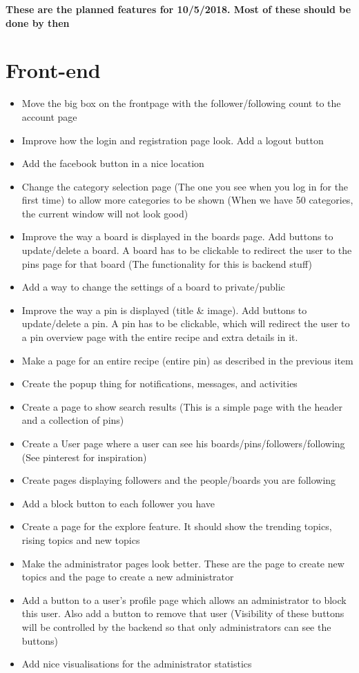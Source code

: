 \documentclass{article}
\begin{document}
\textbf{These are the planned features for 10/5/2018. Most of these should be done by then}

\section{Front-end}
\begin{itemize}
\item Move the big box on the frontpage with the follower/following count to the account page
\item Improve how the login and registration page look. Add a logout button
\item Add the facebook button in a nice location
\item Change the category selection page (The one you see when you log in for the first time) to allow more categories to be shown (When we have 50 categories, the current window will not look good)
\item Improve the way a board is displayed in the boards page. Add buttons to update/delete a board. A board has to be clickable to redirect the user to the pins page for that board (The functionality for this is backend stuff)
\item Add a way to change the settings of a board to private/public
\item Improve the way a pin is displayed (title \& image). Add buttons to update/delete a pin. A pin has to be clickable, which will redirect the user to a pin overview page with the entire recipe and extra details in it.
\item Make a page for an entire recipe (entire pin) as described in the previous item 
\item Create the popup thing for notifications, messages, and activities
\item Create a page to show search results (This is a simple page with the header and a collection of pins)
\item Create a User page where a user can see his boards/pins/followers/following (See pinterest for inspiration)
\item Create pages displaying followers and the people/boards you are following
\item Add a block button to each follower you have
\item Create a page for the explore feature. It should show the trending topics, rising topics and new topics
\item Make the administrator pages look better. These are the page to create new topics and the page to create a new administrator
\item Add a button to a user's profile page which allows an administrator to block this user. Also add a button to remove that user (Visibility of these buttons will be controlled by the backend so that only administrators can see the buttons)
\item Add nice visualisations for the administrator statistics 
\end{itemize}
\end{document}
